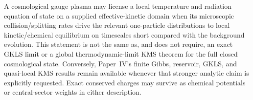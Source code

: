 \documentclass[12pt,a4paper]{article}
\begin{document}
\begin{remark}
\label{p4:rem:v490-local-kinetic-versus-kms}
A cosmological gauge plasma may license a local temperature and radiation
equation of state on a supplied effective-kinetic domain when its microscopic
collision/splitting rates drive the relevant one-particle distributions to
local kinetic/chemical equilibrium on timescales short compared with the
background evolution.  This statement is not the same as, and does not require,
an exact GKLS limit or a global thermodynamic-limit KMS theorem for the full
closed cosmological state.  Conversely, Paper~IV's finite Gibbs, reservoir,
GKLS, and quasi-local KMS results remain available whenever that stronger
analytic claim is explicitly requested.  Exact conserved charges may survive
as chemical potentials or central-sector weights in either description.
\end{remark}
\end{document}
